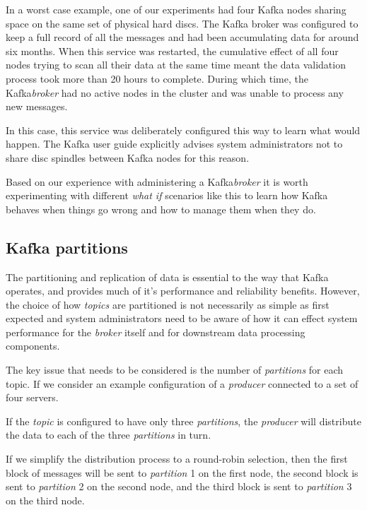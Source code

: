 \documentclass{article}
\newcommand{\kafka} {Kafka\xspace}
\newcommand{\kftopic} {\textit{topic}\xspace}
\newcommand{\kftopics} {\textit{topics}\xspace}
\newcommand{\kfbroker} {\textit{broker}\xspace}
\newcommand{\kfproducer} {\textit{producer}\xspace}
\newcommand{\kfpartition} {\textit{partition}\xspace}
\newcommand{\kfpartitions} {\textit{partitions}\xspace}
\begin{document}
In a worst case example, one of our experiments had four \kafka nodes sharing space on the same set of physical hard discs. The \kafka broker was configured to keep a full record of all the messages and had been accumulating data for around six months.
When this service was restarted, the cumulative effect of all four nodes trying to scan all their data at the same time meant the data validation process took more than 20 hours to complete.
During which time, the \kafka \kfbroker had no active nodes in the cluster and was unable to process any new messages.

In this case, this service was deliberately configured this way to learn what would happen.
The \kafka user guide explicitly advises system administrators not to share disc spindles between \kafka nodes for this reason.

Based on our experience with administering a \kafka \kfbroker it is worth experimenting with different \textit{what if} scenarios like this to learn how \kafka behaves when things go wrong and how to manage them when they do.

\clearpage

\subsection{Kafka partitions}
\label{kafka-partitions}

The partitioning and replication of data is essential to the way that Kafka operates, and provides much of it's performance and reliability benefits.
However, the choice of how \kftopics are partitioned is not necessarily as simple as first expected and system administrators need to be aware of how it can effect system performance for the \kfbroker itself and for downstream data processing components.

The key issue that needs to be considered is the number of \kfpartitions for each topic. If we consider an example configuration of a \kfproducer connected to a set of four servers.

If the \kftopic is configured to have only three \kfpartitions, the \kfproducer will distribute the data to each of the three \kfpartitions in turn.

If we simplify the distribution process to a round-robin selection, then the first block of messages will be sent to \kfpartition 1 on the first node, the second block is sent to \kfpartition 2 on the second node, and the third block is sent to \kfpartition 3 on the third node.
\end{document}
